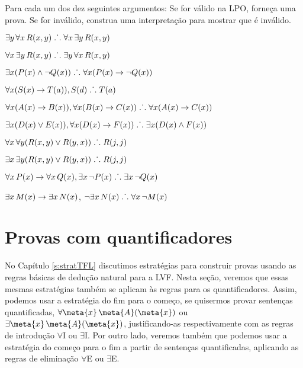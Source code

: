 \solutions
\problempart
\label{pr.FOLvalidornot}
Para cada um dos dez seguintes argumentos: Se for v\'alido na LPO, forne\c ca uma prova. Se for inv\'alido, construa uma interpreta\c c\~ao para mostrar que \'e inv\'alido.
\begin{earg}
\item $\exists y\,\forall x\,\mathord{R}(x,y) \mathrel{\ldotp\dot{}\,\ldotp} \forall x\,\exists y\,\mathord{R}(x,y)$
\item $\forall x\,\exists y\,\mathord{R}(x,y) \mathrel{\ldotp\dot{}\,\ldotp}  \exists y\,\forall x\,\mathord{R}(x,y)$
\item $\exists x(\mathord{P}(x) \wedge \neg \mathord{Q}(x)) \mathrel{\ldotp\dot{}\,\ldotp} \forall x(\mathord{P}(x) \rightarrow \neg \mathord{Q}(x))$
\item $\forall x(\mathord{S}(x) \rightarrow \mathord{T}(a)), \mathord{S}(d) \mathrel{\ldotp\dot{}\,\ldotp} \mathord{T}(a)$
\item $\forall x(\mathord{A}(x)\rightarrow \mathord{B}(x)), \forall x(\mathord{B}(x) \rightarrow \mathord{C}(x)) \mathrel{\ldotp\dot{}\,\ldotp} \forall x(\mathord{A}(x) \rightarrow \mathord{C}(x))$
\item $\exists x(\mathord{D}(x) \vee \mathord{E}(x)), \forall x(\mathord{D}(x) \rightarrow \mathord{F}(x)) \mathrel{\ldotp\dot{}\,\ldotp} \exists x(\mathord{D}(x) \wedge \mathord{F}(x))$
\item $\forall x\,\forall y(\mathord{R}(x,y) \vee \mathord{R}(y,x)) \mathrel{\ldotp\dot{}\,\ldotp} \mathord{R}(j,j)$
\item $\exists x\,\exists y(\mathord{R}(x,y) \vee \mathord{R}(y,x)) \mathrel{\ldotp\dot{}\,\ldotp} \mathord{R}(j,j)$
\item $\forall x\,\mathord{P}(x) \rightarrow \forall x\,\mathord{Q}(x), \exists x\, \neg\mathord{P}(x) \mathrel{\ldotp\dot{}\,\ldotp} \exists x\, \neg \mathord{Q}(x)$
\item $\exists x\,\mathord{M}(x) \rightarrow \exists x\,\mathord{N}(x)$, $\neg \exists x\,\mathord{N}(x)\mathrel{\ldotp\dot{}\,\ldotp}  \forall x\, \neg \mathord{M}(x)$
\end{earg}


\chapter{Provas com quantificadores}

No Capítulo \ref{s:stratTFL}  discutimos estrat\'egias para construir provas usando as regras b\'asicas de dedu\c c\~ao natural para a LVF.  Nesta se\c c\~ao, veremos que essas mesmas estrat\'egias tamb\'em se aplicam \`as regras para os quantificadores. Assim, podemos usar a estrat\'egia do fim para o come\c co, se quisermos provar senten\c cas quantificadas,  $\forall \meta{x}\, \atom{\meta{A}}{\meta{x}}$ ou $\exists \meta{x}\, \atom{\meta{A}}{\meta{x}}$, justificando-as respectivamente com as regras de introdu\c c\~ao $\forall$I ou $\exists$I. Por outro lado, veremos tamb\'em que podemos usar a estrat\'egia do come\c co para o fim a partir de senten\c cas quantificadas, aplicando as regras de elimina\c c\~ao $\forall$E ou $\exists$E.

